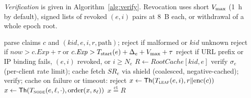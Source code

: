 \emph{Verification} is given in Algorithm~\ref{alg:verify}. Revocation uses short $V_{\max}$ (1~h by default), signed lists of revoked $(e,i)$ pairs at 8~B each, or withdrawal of a whole epoch root.

\begin{algorithm}[t]
\caption{Edge verification of an EMBER token}
\label{alg:verify}
\small
\begin{algorithmic}[1]
  \State parse claims $c$ and $(\mathit{kid},e,i,r,\text{path})$; reject if malformed or $\mathit{kid}$ unknown
  \State reject if $\mathit{now}>c.\mathit{Exp}+\tau$ or $c.\mathit{Exp}>T_{\text{start}}(e)+\Delta_e+V_{\max}+\tau$
  \State reject if URL prefix or IP binding fails, $(e,i)$ revoked, or $i\ge N_e$
  \State $R\gets\mathit{RootCache}[\mathit{kid},e]$
     verify $\sigma_e$ (per-client rate limit); cache
    \Else{} fetch $SR_e$ via shield (coalesced, negative-cached); verify; cache
    \EndIf
    \State on failure or timeout: \Return reject 
  \EndIf
  \State $x\gets\mathsf{Th}(T_{\textsc{leaf}}(e,i),r\|\mathrm{enc}(c))$
   $x\gets\mathsf{Th}(T_{\textsc{node}}(e,\ell,\cdot),\mathrm{order}(x,s_\ell))$
  \EndFor
  \State \Return $x\stackrel{\text{ct}}{=}R$
\EndProcedure
\end{algorithmic}
\end{algorithm}

